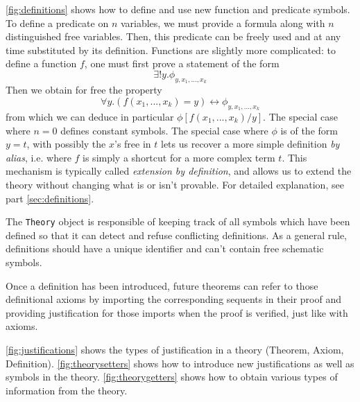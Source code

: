 \autoref{fig:definitions} shows how to define and use new function and predicate symbols. To define a predicate on $n$ variables, we must provide a formula along with $n$ distinguished free variables. Then, this predicate can be freely used and at any time substituted by its definition. Functions are slightly more complicated: to define a function $f$, one must first prove a statement of the form
$$\exists ! y. \phi_{y, x_1,...,x_k}$$
Then we obtain for free the property
$$\forall y. (f(x_1,...,x_k)=y) \leftrightarrow \phi_{y, x_1,...,x_k}$$
from which we can deduce in particular $\phi[f(x_1,...,x_k)/y]$.
The special case where $n=0$ defines constant symbols. The special case where $\phi$ is of the form $y=t$, with possibly the $x$'s free in $t$ lets us recover a more simple definition \textit{by alias}, i.e. where  $f$ is simply a shortcut for a more complex term $t$.
This mechanism is typically called \textit{extension by definition}, and allows us to extend the theory without changing what is or isn't provable. For detailed explanation, see part \autoref{sec:definitions}.

The \lstinline{Theory}{} object is responsible of keeping track of all symbols which have been defined so that it can detect and refuse conflicting definitions. As a general rule, definitions should have a unique identifier and can't contain free schematic symbols.

Once a definition has been introduced, future theorems can refer to those definitional axioms by importing the corresponding sequents in their proof and providing justification for those imports when the proof is verified, just like with axioms.

\autoref{fig:justifications} shows the types of justification in a theory (Theorem, Axiom, Definition). \autoref{fig:theorysetters} shows how to introduce new justifications as well as symbols in the theory. \autoref{fig:theorygetters} shows how to obtain various types of information from the theory.



